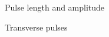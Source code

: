 \begin{Investigation}{Pulse length and amplitude }
\begin{eocexercises}{Transverse pulses}
\begin{enumerate}[noitemsep, label=\textbf{\arabic*}. ]
% 

\end{enumerate}
\end{eocexercises}
\end{Investigation}
